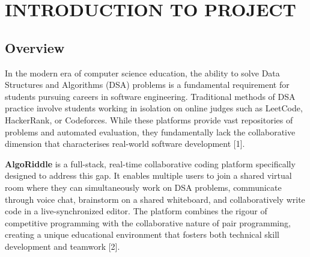 \documentclass[12pt,a4paper,oneside]{report}
\begin{document}
\clearpage



\tableofcontents
\clearpage



\chapter{INTRODUCTION TO PROJECT}

\section{Overview}

In the modern era of computer science education, the ability to solve Data Structures and Algorithms (DSA) problems is a fundamental requirement for students pursuing careers in software engineering. Traditional methods of DSA practice involve students working in isolation on online judges such as LeetCode, HackerRank, or Codeforces. While these platforms provide vast repositories of problems and automated evaluation, they fundamentally lack the collaborative dimension that characterises real-world software development [1].

\textbf{AlgoRiddle} is a full-stack, real-time collaborative coding platform specifically designed to address this gap. It enables multiple users to join a shared virtual room where they can simultaneously work on DSA problems, communicate through voice chat, brainstorm on a shared whiteboard, and collaboratively write code in a live-synchronized editor. The platform combines the rigour of competitive programming with the collaborative nature of pair programming, creating a unique educational environment that fosters both technical skill development and teamwork [2].
\end{document}
